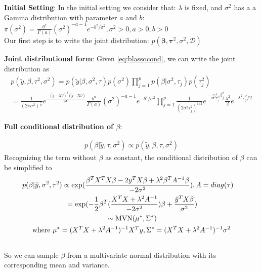 \textbf{Initial Setting}:
In the initial setting we consider that: $\lambda$ is fixed, and $\sigma^2$ has a a Gamma distribution with parameter $a$ and $b$: $\pi(\sigma^2) = \frac{b^a}{\Gamma(a)} (\sigma^2)^{-a-1}e^{-b^2/\sigma^2},\sigma^2>0,a>0,b>0$ \\
Our first step is to write the joint distribution: $p(\mathbf{\beta},\mathbf{\tau}^2,\sigma^{2},\mathcal{D})$

\textbf{Joint distributional form}:
Given \autoref{eq:blassocond}, we can write the joint distribution as
\begin{equation}
	\begin{multlined}
		p(\tilde{y},\beta,\tau^2,\sigma^2) = p(\tilde{y}|\beta,\sigma^2,\tau)p(\sigma^2)\prod_{j=1}^p p(\beta|\sigma^2,\tau_j)p(\tau_j^2)\\
		=\frac{1}{(2\pi\sigma^2)^{\frac{n}{2}}} e^{\frac{-(\tilde{y} -X\beta)^T(\tilde{y}-X\beta)}{2\sigma^2}}
		\frac{b^a}{\Gamma(a)} (\sigma^2)^{-a-1}e^{-b^2/\sigma^2}
		\prod_{j=1}^p \frac{1}{(2\sigma^2\tau_j^2)^{1/2}}e^{-\frac{-1}{2\sigma^2\tau_j^2}\beta_j^2}\frac{\lambda^2}{2}e^{-\lambda^2\tau_j^2/2}
	\end{multlined}
\end{equation}

\textbf{Full conditional distribution of $\beta$}:

\begin{equation}
	\begin{multlined}
		p(\beta | \tilde{y},\tau,\sigma^2) \propto  	p(\tilde{y},\beta,\tau,\sigma^2)
	\end{multlined}
\end{equation}
Recognizing the term without $\beta$ as constant, the conditional distribution of $\beta$ can be simplified to
\begin{equation}
	\begin{multlined}
		p(\beta|\tilde{y},\sigma^2,\tau^2) \propto \textnormal{exp}(\frac{\beta^TX^TX\beta - 2y^TX\beta +\lambda^2\beta^TA^{-1}\beta}{-2\sigma^2}), A = diag(\tau)\\
		=  \textnormal{exp}(-\frac{1}{2}\beta^T(\frac{X^TX + \lambda^2A^{-1}}{-2\sigma^2})\beta + \frac{\tilde{y}^TX\beta}{\sigma^2})\\
		\sim \textnormal{MVN}(\mu^*,\Sigma^*)\\
		\textnormal{where } \mu^* = (X^TX+\lambda^2A^{-1})^{-1}X^Ty, \Sigma^* = (X^TX+\lambda^2A^{-1})^{-1}\sigma^2\\
	\end{multlined}
\end{equation}
So we can sample $\beta$ from a multivariate normal distribution with its corresponding mean and variance.

